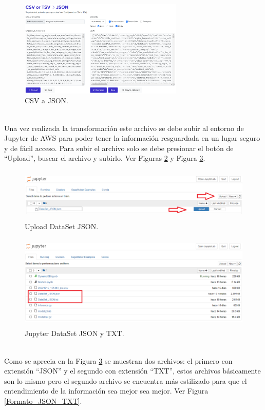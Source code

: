 \documentclass[a4paper,10pt, oneside, titlepage]{article}
\begin{document}
	\begin{figure}[!h]
		\centering
		\includegraphics[width = 1\linewidth, height = 4.6cm]{DataSet_to_JSON.png}
		\caption{CSV a JSON.}
		\label{DataSet_to_JSON}
	\end{figure} \\
	\indent Una vez realizada la transformación este archivo se debe subir al entorno de Jupyter de AWS para poder tener la información resguardada en un lugar seguro y de fácil acceso. Para subir el archivo solo se debe presionar el botón de ``Upload'', buscar el archivo y subirlo. Ver Figuras \ref{Upload_Jupyter_DataSet_JSON} y Figura \ref{Jupyter_DataSet_JSON}.
	\begin{figure}[!h]
		\centering
		\includegraphics[width = 1\linewidth, height = 2.5cm]{Upload_Jupyter_DataSet_JSON.png}
		\caption{Upload DataSet JSON.}
		\label{Upload_Jupyter_DataSet_JSON}
	\end{figure}
	\begin{figure}[!h]
		\centering
		\includegraphics[width = 1\linewidth, height = 4.5cm]{Jupyter_DataSet_JSON.png}
		\caption{Jupyter DataSet JSON y TXT.}
		\label{Jupyter_DataSet_JSON}
	\end{figure} \\
	\indent Como se aprecia en la Figura \ref{Jupyter_DataSet_JSON} se muestran dos archivos: el primero con extensión ``JSON'' y el segundo con extensión ``TXT'', estos archivos básicamente son lo mismo pero el segundo archivo se encuentra más estilizado para que el entendimiento de la información sea mejor sea mejor. Ver Figura \ref{Formato_JSON_TXT}.
\end{document}
